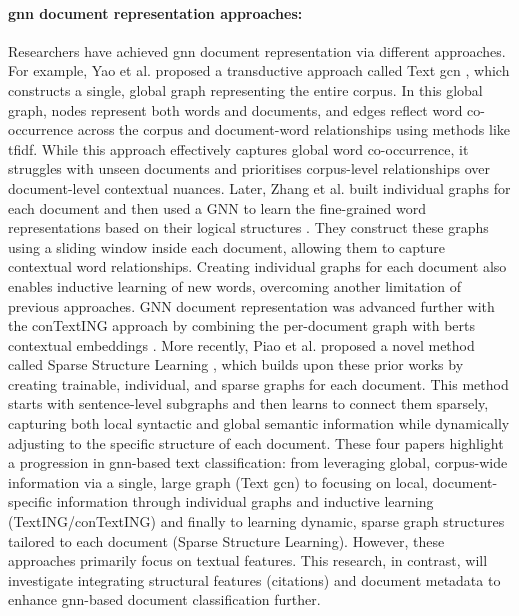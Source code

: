 \documentclass[10pt,oneside]{book}
\begin{document}
\paragraph{\gls*{gnn} document representation approaches:}
Researchers have achieved \gls*{gnn} document representation via different approaches. For example, Yao et al. proposed a transductive approach called Text \gls*{gcn} \cite{yao_graph_2018}, which constructs a single, global graph representing the entire corpus. In this global graph, nodes represent both words and documents, and edges reflect word co-occurrence across the corpus and document-word relationships using methods like \gls*{tfidf}. While this approach effectively captures global word co-occurrence, it struggles with unseen documents and prioritises corpus-level relationships over document-level contextual nuances. Later, Zhang et al. built individual graphs for each document and then used a GNN to learn the fine-grained word representations based on their logical structures \cite{zhang_evaluating_2020}. They construct these graphs using a sliding window inside each document, allowing them to capture contextual word relationships. Creating individual graphs for each document also enables inductive learning of new words, overcoming another limitation of previous approaches. GNN document representation was advanced further with the conTextING approach by combining the per-document graph with \glspl*{bert}  contextual embeddings \cite{huang_contexting_2022}. More recently, Piao et al. proposed a novel method called Sparse Structure Learning \cite{piao_sparse_2022}, which builds upon these prior works by creating trainable, individual, and sparse graphs for each document. This method starts with sentence-level subgraphs and then learns to connect them sparsely, capturing both local syntactic and global semantic information while dynamically adjusting to the specific structure of each document. These four papers highlight a progression in \gls*{gnn}-based text classification: from leveraging global, corpus-wide information via a single, large graph (Text \gls*{gcn}) to focusing on local, document-specific information through individual graphs and inductive learning (TextING/conTextING) and finally to learning dynamic, sparse graph structures tailored to each document (Sparse Structure Learning). However, these approaches primarily focus on textual features. This research, in contrast, will investigate integrating structural features (citations) and document metadata to enhance \gls*{gnn}-based document classification further.
\end{document}
